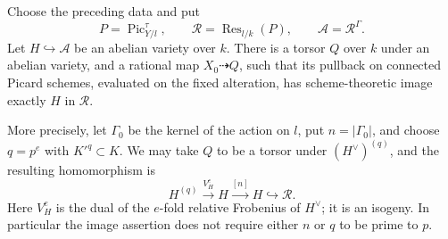\begin{lemma}
\label{B:invariant-abelian-realization}
Choose the preceding data and put
\[
 P=\operatorname{Pic}^{\tau}_{Y/l},\qquad
 \mathcal R=\operatorname{Res}_{l/k}(P),\qquad
 \mathcal A=\mathcal R^\Gamma.
\]
Let $H\hookrightarrow\mathcal A$ be an abelian variety over
$k$.  There is a torsor $Q$ over $k$ under an abelian variety,
and a rational map $X_0\dashrightarrow Q$, such that its
pullback on connected Picard schemes, evaluated on the fixed
alteration, has scheme-theoretic image exactly $H$ in
$\mathcal R$.

More precisely, let $\Gamma_0$ be the kernel of the action on
$l$, put $n=|\Gamma_0|$, and choose $q=p^e$ with $K'^q\subset K$.
We may take $Q$ to be a torsor under $(H^\vee)^{(q)}$, and the
resulting homomorphism is
\[
 H^{(q)}\xrightarrow{V_H^e}H\xrightarrow{[n]}H
       \hookrightarrow\mathcal R.                 \tag{B.2.14}
\]
Here $V_H^e$ is the dual of the $e$-fold relative Frobenius of
$H^\vee$; it is an isogeny.  In particular the image assertion
does not require either $n$ or $q$ to be prime to $p$.
\end{lemma}

